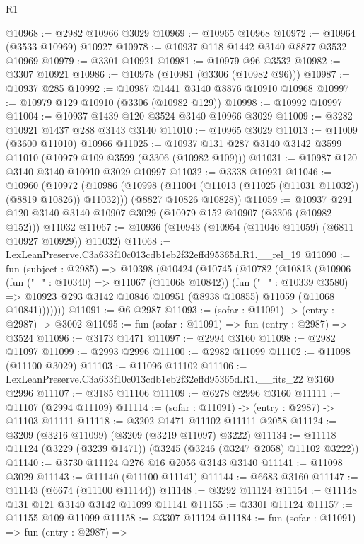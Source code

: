 \begin{lexlean}{R1}
\begin{coremodule}
@10968 := @2982 @10966 @3029
@10969 := @10965 @10968
@10972 := @10964 (@3533 @10969) @10927
@10978 := @10937 @118 @1442 @3140 @8877 @3532 @10969
@10979 := @3301 @10921
@10981 := @10979 @96 @3532
@10982 := @3307 @10921
@10986 := @10978 (@10981 (@3306 (@10982 @96)))
@10987 := @10937 @285
@10992 := @10987 @1441 @3140 @8876 @10910 @10968
@10997 := @10979 @129 @10910 (@3306 (@10982 @129))
@10998 := @10992 @10997
@11004 := @10937 @1439 @120 @3524 @3140 @10966 @3029
@11009 := @3282 @10921 @1437 @288 @3143 @3140
@11010 := @10965 @3029
@11013 := @11009 (@3600 @11010) @10966
@11025 := @10937 @131 @287 @3140 @3142 @3599 @11010 (@10979 @109 @3599 (@3306 (@10982 @109)))
@11031 := @10987 @120 @3140 @3140 @10910 @3029 @10997
@11032 := @3338 @10921
@11046 := @10960
    (@10972
      (@10986 (@10998 (@11004 (@11013 (@11025 (@11031 @11032)) (@8819 @10826)) @11032)))
      (@8827 @10826 @10828))
@11059 := @10937
    @291
    @120
    @3140
    @3140
    @10907
    @3029
    (@10979 @152 @10907 (@3306 (@10982 @152)))
    @11032
@11067 := @10936 (@10943 (@10954 (@11046 @11059) (@6811 @10927 @10929)) @11032)
@11068 := LexLeanPreserve.C3a633f10c013cdb1eb2f32effd95365d.R1.__rel_19
@11090 := fun (subject : @2985) =>
  @10398
    (@10424
      (@10745
        (@10782
          (@10813
            (@10906
              (fun ("_" : @10340) => @11067 (@11068 @10842))
              (fun ("_" : @10339 @3580) =>
              @10923 @293 @3142 @10846 @10951 (@8938 @10855) @11059 (@11068 @10841)))))))
@11091 := @6 @2987
@11093 := (sofar : @11091) -> (entry : @2987) -> @3002
@11095 := fun (sofar : @11091) => fun (entry : @2987) => @3524
@11096 := @3173 @1471
@11097 := @2994 @3160
@11098 := @2982 @11097
@11099 := @2993 @2996
@11100 := @2982 @11099
@11102 := @11098 (@11100 @3029)
@11103 := @11096 @11102
@11106 := LexLeanPreserve.C3a633f10c013cdb1eb2f32effd95365d.R1.__fits_22 @3160 @2996
@11107 := @3185 @11106
@11109 := @6278 @2996 @3160
@11111 := @11107 (@2994 @11109)
@11114 := (sofar : @11091) -> (entry : @2987) -> @11103 @11111
@11118 := @3202 @1471 @11102 @11111 @2058
@11124 := @3209 (@3216 @11099) (@3209 (@3219 @11097) @3222)
@11134 := @11118 @11124 (@3229 (@3239 @1471)) (@3245 (@3246 (@3247 @2058) @11102 @3222))
@11140 := @3730 @11124 @276 @16 @2056 @3143 @3140
@11141 := @11098 @3029
@11143 := @11140 (@11100 @11141)
@11144 := @6683 @3160
@11147 := @11143 (@6674 (@11100 @11144))
@11148 := @3292 @11124
@11154 := @11148 @131 @121 @3140 @3142 @11099 @11141
@11155 := @3301 @11124
@11157 := @11155 @109 @11099
@11158 := @3307 @11124
@11184 := fun (sofar : @11091) =>
  fun (entry : @2987) =>

\end{coremodule}
\end{lexlean}
